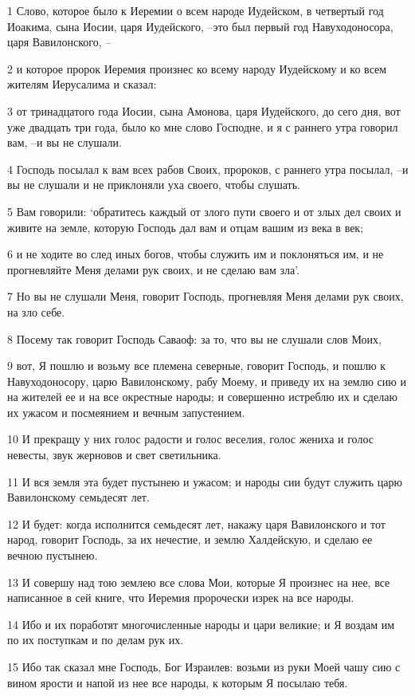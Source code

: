 \par 1 Слово, которое было к Иеремии о всем народе Иудейском, в четвертый год Иоакима, сына Иосии, царя Иудейского, --это был первый год Навуходоносора, царя Вавилонского, --
\par 2 и которое пророк Иеремия произнес ко всему народу Иудейскому и ко всем жителям Иерусалима и сказал:
\par 3 от тринадцатого года Иосии, сына Амонова, царя Иудейского, до сего дня, вот уже двадцать три года, было ко мне слово Господне, и я с раннего утра говорил вам, --и вы не слушали.
\par 4 Господь посылал к вам всех рабов Своих, пророков, с раннего утра посылал, --и вы не слушали и не приклоняли уха своего, чтобы слушать.
\par 5 Вам говорили: `обратитесь каждый от злого пути своего и от злых дел своих и живите на земле, которую Господь дал вам и отцам вашим из века в век;
\par 6 и не ходите во след иных богов, чтобы служить им и поклоняться им, и не прогневляйте Меня делами рук своих, и не сделаю вам зла'.
\par 7 Но вы не слушали Меня, говорит Господь, прогневляя Меня делами рук своих, на зло себе.
\par 8 Посему так говорит Господь Саваоф: за то, что вы не слушали слов Моих,
\par 9 вот, Я пошлю и возьму все племена северные, говорит Господь, и пошлю к Навуходоносору, царю Вавилонскому, рабу Моему, и приведу их на землю сию и на жителей ее и на все окрестные народы; и совершенно истреблю их и сделаю их ужасом и посмеянием и вечным запустением.
\par 10 И прекращу у них голос радости и голос веселия, голос жениха и голос невесты, звук жерновов и свет светильника.
\par 11 И вся земля эта будет пустынею и ужасом; и народы сии будут служить царю Вавилонскому семьдесят лет.
\par 12 И будет: когда исполнится семьдесят лет, накажу царя Вавилонского и тот народ, говорит Господь, за их нечестие, и землю Халдейскую, и сделаю ее вечною пустынею.
\par 13 И совершу над тою землею все слова Мои, которые Я произнес на нее, все написанное в сей книге, что Иеремия пророчески изрек на все народы.
\par 14 Ибо и их поработят многочисленные народы и цари великие; и Я воздам им по их поступкам и по делам рук их.
\par 15 Ибо так сказал мне Господь, Бог Израилев: возьми из руки Моей чашу сию с вином ярости и напой из нее все народы, к которым Я посылаю тебя.
